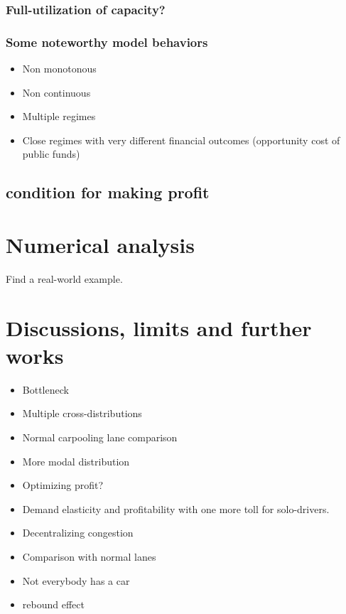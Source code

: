 \documentclass[english, a4paper]{article}
\theoremstyle{plain}
\theoremstyle{definition}
\theoremstyle{remark}
\begin{document}
\subsubsection{Full-utilization of capacity?}
\subsubsection{Some noteworthy model behaviors}
    \begin{itemize}
        \item Non monotonous
        \item Non continuous
        \item Multiple regimes
        \item Close regimes with very different financial outcomes (opportunity cost of public funds)
    \end{itemize}

\subsection{condition for making profit}

\section{Numerical analysis}

\alert{Find a real-world example.}

\section{Discussions, limits and further works}
\label{section:discussions_and_limits}

\begin{itemize}
    \item Bottleneck
    \item Multiple cross-distributions
    \item Normal carpooling lane comparison
    \item More modal distribution
    \item Optimizing profit?
    \item Demand elasticity and profitability with one more toll for solo-drivers.
    \item Decentralizing congestion
    \item Comparison with normal lanes
    \item Not everybody has a car
    \item rebound effect
\end{itemize}
\end{document}
